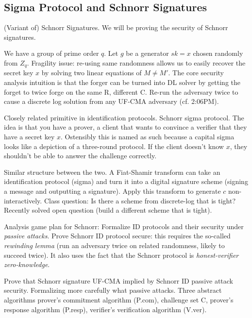 \subsection{Sigma Protocol and Schnorr Signatures}

(Variant of) Schnorr Signatures.
We will be proving the security of Schnorr signatures. 

We have a group of prime order $q$. Let $g$ be a generator $sk = x$ chosen randomly from $Z_q$. Fragility issue: re-using same randomness allows us to easily recover the secret key $x$ by solving two linear equations of $M\neq M'$.
The core security analysis intuition is that the forger can be turned into DL solver by getting the forget to twice forge on the same R, different C. Re-run the adversary twice to cause a discrete log solution from any UF-CMA adversary (cf. 2:06PM).

Closely related primitive in identification protocols. Schnorr sigma protocol. The idea is that you have a prover, a client that wants to convince a verifier that they have a secret key $x$. Ostensibly this is named as such because a capital sigma looks like a depiction of a three-round protocol. If the client doesn't know $x$, they shouldn't be able to answer the challenge correctly.

Similar structure between the two. A Fiat-Shamir transform can take an identification protocol (sigma) and turn it into a digital signature scheme (signing a message and outputting a signature). Apply this transform to generate $c$ non-interactively. Class question:
Is there a scheme from discrete-log that is tight?
Recently solved open question (build a different scheme that is tight). 

Analysis game plan for Schnorr:
Formalize ID protocols and their security under \emph{passive attacks}. Prove Schnorr ID protocol secure: this requires the so-called \emph{rewinding lemma} (run an adversary twice on related randomness, likely to succeed twice). It also uses the fact that the Schnorr protocol is \emph{honest-verifier zero-knowledge}.

Prove that Schnorr signature UF-CMA implied by Schnorr ID passive attack security. Formalizing more carefully what passive attacks. Three abstract algorithms prover's commitment algorithm (P.com), challenge set C, prover's response algorithm (P.resp), verifier's verification algorithm (V.ver).

